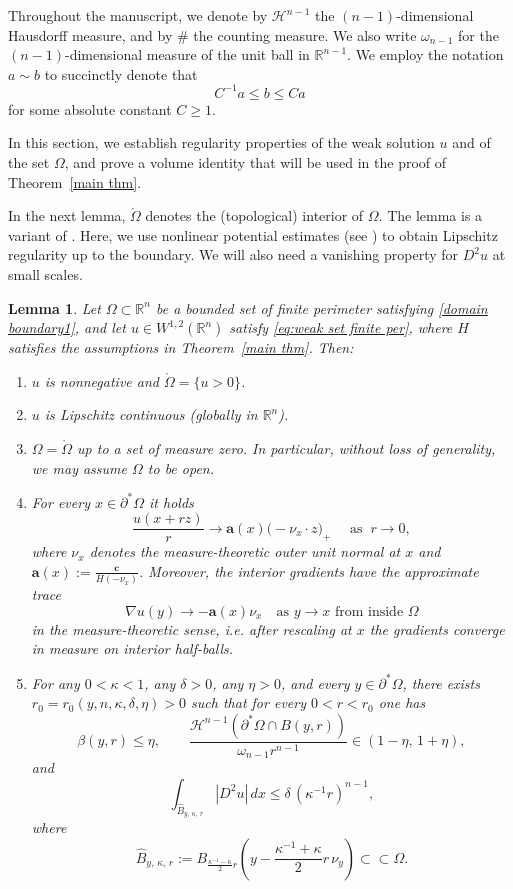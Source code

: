 \documentclass[reqno,11pt]{amsart}
\makeatletter
\newtheorem{lem}[thm]{Lemma}%
\numberwithin{equation}{section}
\theoremstyle{remark}
\makeatother
\begin{document}
Throughout the manuscript, we denote by $\mathscr H^{n-1}$ the $(n-1)$-dimensional Hausdorff measure, and by $\#$
the counting measure. We also write $\omega_{n-1}$ for the $(n-1)$-dimensional measure of the unit ball in $\mathbb R^{n-1}$. {We employ the notation $a \sim b$ to succinctly denote that}
$$
{C^{-1} a \leq b \leq C a}
$$
{for some absolute constant $C \geq 1$.}

In this section, we establish regularity properties of the weak solution $u$ and of the set $\Omega$, and prove
a volume identity that will be used in the proof of Theorem~\ref{main thm}.

In the next lemma, $\mathring\Omega$ denotes the (topological) interior of $\Omega$. The lemma is a variant of
\cite[Lemma~2.1]{FZ2025}. Here, we use nonlinear potential estimates (see \cite{KM12,KM1994}) to obtain Lipschitz
regularity up to the boundary. We will also need a vanishing property for $D^2u$ at small scales.

\begin{lem}\label{basic property u}
Let $\Omega\subset \mathbb R^n$ be a bounded set of finite perimeter satisfying \eqref{domain boundary1},
and let $u \in W^{1,2}(\mathbb R^n)$ satisfy \eqref{eq:weak set finite per}, where $H$ satisfies the assumptions in Theorem~\ref{main thm}.
Then:
\begin{enumerate}
\item[(1)] $u$ is nonnegative and $\mathring\Omega=\{u>0\}$.

\item[(2)] $u$ is {Lipschitz continuous} (globally in $\mathbb R^n$).

\item[(3)] $\Omega=\mathring\Omega$ up to a set of measure zero. In particular, without loss of generality, we may assume
$\Omega$ to be open.

\item[(4)] For every $x\in \partial^*\Omega$ it holds
\[
\frac{u(x+rz)}{r} \to  \mathbf{a}(x)\bigl(-\nu_x\cdot z \bigr)_+ \quad \text{ as } \ r\to 0,
\]
where $\nu_x$ denotes the measure-theoretic outer unit normal at $x$ and $\mathbf {a}(x):=\frac{\mathbf c}{H(-\nu_x)}$.
{Moreover, the interior gradients have the approximate trace
\[
\nabla u(y)\to -\mathbf a(x)\nu_x
\quad\text{as } y\to x \text{ from inside }\Omega
\]
in the measure-theoretic sense, i.e. after rescaling at $x$ the gradients converge in measure on interior half-balls.}

\item[(5)] For any $0<\kappa<1$, any $\delta>0$, any $\eta>0$, and every $y\in \partial^*\Omega$, there exists
$r_0=r_0(y,n,\kappa,\delta,\eta)>0$ such that for every $0<r<r_0$ one has
\[
\beta(y,r)\le \eta,
\qquad
\frac{\mathscr {H}^{n-1}(\partial^*\Omega\cap B(y,r))}{\omega_{n-1}r^{n-1}}\in (1-\eta,\,1+\eta),
\]
and
\[
\int_{\hat B_{y,\,\kappa,\, r}}|D^2u|\, dx\le \delta \,(\kappa^{-1} r)^{n-1},
\]
where
\[
\hat B_{y,\,\kappa,\, r}:=
B_{\frac{\kappa^{-1}-\kappa}{2}r}\!\left(y-\frac{\kappa^{-1}+\kappa}{2}r\,\nu_y\right){\subset\subset \Omega}.
\]
\end{enumerate}
\end{lem}
\end{document}
